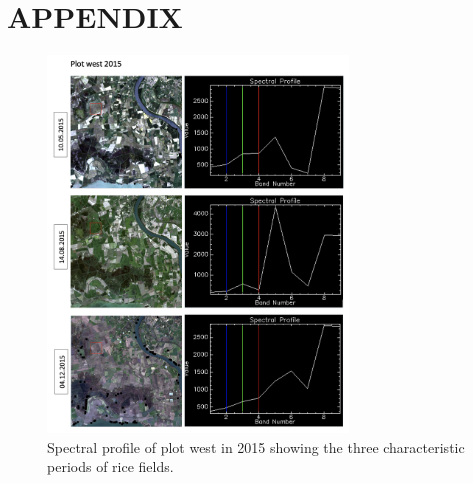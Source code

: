 \documentclass[a4paper, 10pt, conference]{ieeeconf}      %
\begin{document}

















\nocite{*}







\newpage

\section{APPENDIX}

\begin{figure}[h]
\centering
\includegraphics[width=8cm]{Figures/Spectral_profiles_2015_west.png}
\caption{Spectral profile of plot west in 2015 showing the three characteristic periods of rice fields.}
\label{fig:spectral2015}
\end{figure}
\end{document}
